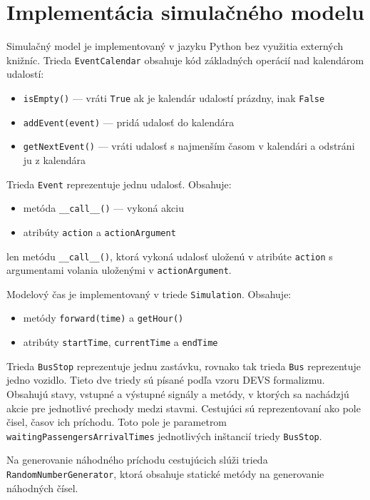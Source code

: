 \section{Implementácia simulačného modelu}

Simulačný model je implementovaný v jazyku Python bez využitia externých knižníc.
Trieda \texttt{EventCalendar} obsahuje kód základných operácií nad kalendárom udalostí:
\begin{itemize}
  \item \texttt{isEmpty()} --- vráti \texttt{True} ak je kalendár udalostí prázdny, inak \texttt{False}
  \item \texttt{addEvent(event)} --- pridá udalosť do kalendára
  \item \texttt{getNextEvent()} --- vráti udalosť s najmenším časom v kalendári a odstráni ju z kalendára
\end{itemize}

Trieda \texttt{Event} reprezentuje jednu udalosť.
Obsahuje:
\begin{itemize}
  \item metóda \texttt{\_\_call\_\_()} --- vykoná akciu
  \item atribúty \texttt{action} a \texttt{actionArgument}
\end{itemize}

len metódu \texttt{\_\_call\_\_()}, ktorá vykoná udalosť uloženú v atribúte \texttt{action} s argumentami volania uloženými v \texttt{actionArgument}.

Modelový čas je implementovaný v triede \texttt{Simulation}.
Obsahuje:
\begin{itemize}
  \item metódy \texttt{forward(time)} a \texttt{getHour()}
  \item atribúty \texttt{startTime}, \texttt{currentTime} a \texttt{endTime}
\end{itemize}

Trieda \texttt{BusStop} reprezentuje jednu zastávku, rovnako tak trieda \texttt{Bus} reprezentuje jedno vozidlo.
Tieto dve triedy sú písané podľa vzoru DEVS formalizmu. Obsahujú stavy, vstupné a výstupné signály a metódy, v ktorých sa nachádzjú akcie pre jednotlivé prechody medzi stavmi.
Cestujúci sú reprezentovaní ako pole čisel, časov ich príchodu.
Toto pole je parametrom \texttt{waitingPassengersArrivalTimes} jednotlivých inštancií triedy \texttt{BusStop}.

Na generovanie náhodného príchodu cestujúcich slúži trieda \texttt{RandomNumberGenerator}, ktorá obsahuje statické metódy na generovanie náhodných čísel.

